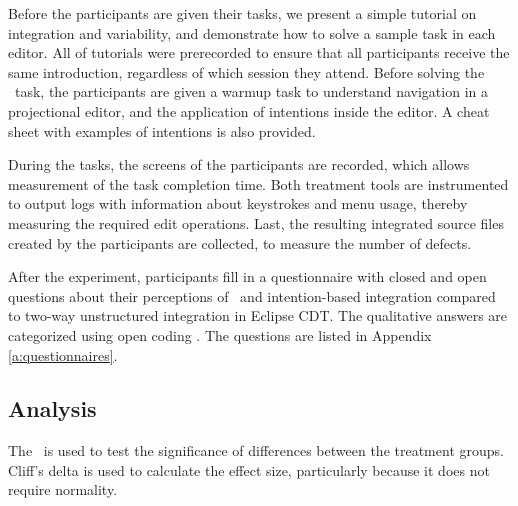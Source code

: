 Before the participants are given their tasks, we present a simple tutorial on integration and variability, and demonstrate how to solve a sample task in each editor. All of tutorials were prerecorded to ensure that all participants receive the same introduction, regardless of which session they attend. Before solving the \tooln~task, the participants are given a warmup task to understand navigation in a projectional editor, and the application of intentions inside the editor. A cheat sheet with examples of intentions is also provided.

During the tasks, the screens of the participants are recorded, which allows measurement of the task completion time. Both treatment tools are instrumented to output logs with information about keystrokes and menu usage, thereby measuring the required edit operations. Last, the resulting integrated source files created by the participants are collected, to measure the number of defects.

After the experiment, participants fill in a questionnaire with closed and open questions about their perceptions of \tooln~and intention-based integration compared to two-way unstructured integration in Eclipse CDT. The qualitative answers are categorized using open coding \cite{strauss}. The questions are listed in Appendix \ref{a:questionnaires}.

\subsection{Analysis}
The \anova~is used to test the significance of differences between the treatment groups. Cliff's delta is used to calculate the effect size, particularly because it does not require normality.
